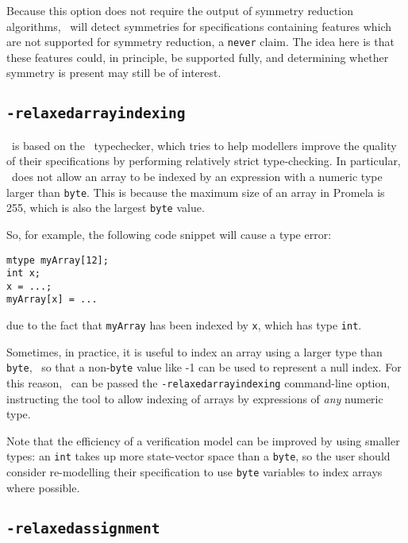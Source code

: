 Because this option does not require the output of symmetry reduction algorithms, \topspin\ will detect symmetries for specifications containing features
which are not supported for symmetry reduction, \eg a \texttt{never} claim.  The idea here is that these features could, in principle, be supported
fully, and determining whether symmetry is present may still be of interest.

\subsection{\texttt{-relaxedarrayindexing}}\label{sec:overview:commandline:relaxedarray}

\topspin\ is based on the \etch\ typechecker, which tries to help modellers improve the quality of their specifications by performing relatively
strict type-checking.  In particular, \etch\ does not allow an array to be indexed by an expression with a numeric type larger than \texttt{byte}.
This is because the maximum size of an array in Promela is 255, which is also the largest \texttt{byte} value.

So, for example, the following code snippet will cause a type error:

\begin{lstlisting}
mtype myArray[12];
int x;
x = ...;
myArray[x] = ...
\end{lstlisting}

\noindent due to the fact that \texttt{myArray} has been indexed by \texttt{x}, which has type \texttt{int}.

Sometimes, in practice, it is useful to index an array using a larger type than \texttt{byte}, \eg\ so that a non-\texttt{byte} value like
-1 can be used to represent a null index.  For this reason, \topspin\ can be passed the \texttt{-relaxedarrayindexing} command-line option,
instructing the tool to allow indexing of arrays by expressions of \emph{any} numeric type.

Note that the efficiency of a verification model can be improved by using smaller types: an \texttt{int} takes up more state-vector space than
a \texttt{byte}, so the user should consider re-modelling their specification to use \texttt{byte} variables to index arrays where possible.

\subsection{\texttt{-relaxedassignment}}\label{sec:overview:commandline:relaxedassign}

